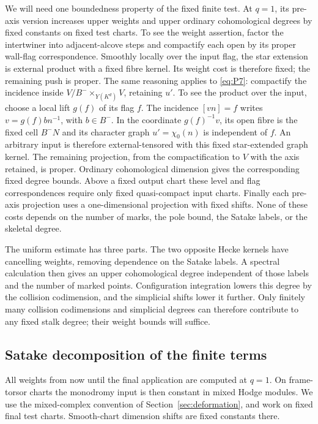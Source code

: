 \documentclass[11pt]{article}
\numberwithin{equation}{section}
\theoremstyle{definition}
\theoremstyle{remark}
\begin{document}
We will need one boundedness property of the fixed finite test.  At
$q=1$, its pre-axis version increases upper weights and upper ordinary
cohomological degrees by fixed constants on fixed test charts.  To see
the weight assertion, factor the intertwiner into adjacent-alcove
steps and compactify each open by its proper wall-flag correspondence.
Smoothly locally over the input flag, the star extension is external
product with a fixed fibre kernel.  Its weight cost is therefore fixed;
the remaining push is proper.  The same reasoning applies to
\eqref{eq:P7}: compactify the incidence inside
$V/B^-\times_{Y(K^d)}V$, retaining $u'$.  To see the product over the
input, choose a local lift $g(f)$ of its flag $f$.  The incidence
$[vn]=f$ writes $v=g(f)b n^{-1}$, with $b\in B^-$.  In the coordinate
$g(f)^{-1}v$, its open fibre is the fixed cell $B^-N$ and its character
graph $u'=\chi_0(n)$ is independent of $f$.  An arbitrary input is
therefore external-tensored with this fixed star-extended graph kernel.
The remaining projection, from the compactification to $V$ with the
axis retained, is proper.  Ordinary cohomological dimension gives the
corresponding fixed degree bounds.  Above a fixed output chart these
level and flag correspondences require only fixed quasi-compact input
charts.  Finally each pre-axis projection uses a one-dimensional
projection with fixed shifts.  None of these costs depends on the
number of marks, the pole bound, the Satake labels, or the skeletal
degree.

The uniform estimate has three parts.  The two opposite Hecke kernels
have cancelling weights, removing dependence on the Satake labels.
A spectral calculation then gives an upper cohomological degree
independent of those labels and the number of marked points.
Configuration integration lowers this degree by the collision
codimension, and the simplicial shifts lower it further.  Only finitely
many collision codimensions and simplicial degrees can therefore
contribute to any fixed stalk degree; their weight bounds will suffice.

\subsection{Satake decomposition of the finite terms}
\label{planch:satake-decomposition}

All weights from now until the final application are computed at
$q=1$.  On frame-torsor charts the monodromy input is then constant in
mixed Hodge modules.  We use the mixed-complex convention of
Section~\ref{sec:deformation}, and work on fixed final test charts.
Smooth-chart dimension shifts are fixed constants there.
\end{document}
